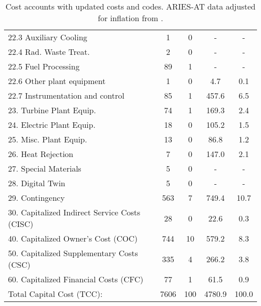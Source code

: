\begin{table}[h!]
{\begin{tabular}{lcccc}
\hspace{10mm}22.3 Auxiliary Cooling & 1 & 0 & - & - \\
\hspace{10mm}22.4 Rad. Waste Treat. & 2 & 0 & - & - \\
\hspace{10mm}22.5 Fuel Processing & 89 & 1 & - & - \\
\hspace{10mm}22.6 Other plant equipment & 1 & 0 & 4.7 & 0.1 \\
\hspace{10mm}22.7 Instrumentation and control & 85 & 1 & 457.6 & 6.5 \\
\hspace{5mm}23. Turbine Plant Equip. & 74 & 1 & 169.3 & 2.4 \\
\hspace{5mm}24. Electric Plant Equip. & 18 & 0 & 105.2 & 1.5 \\
\hspace{5mm}25. Misc. Plant Equip. & 13 & 0 & 86.8 & 1.2 \\
\hspace{5mm}26. Heat Rejection & 7 & 0 & 147.0 & 2.1 \\
\hspace{5mm}27. Special Materials & 5 & 0 & - & - \\
\hspace{5mm}28. Digital Twin & 5 & 0 & - & - \\
\hspace{5mm}29. Contingency & 563 & 7 & 749.4 & 10.7 \\
30. Capitalized Indirect Service Costs (CISC) & 28 & 0 & 22.6 & 0.3 \\
40. Capitalized Owner’s Cost (COC) & 744 & 10 & 579.2 & 8.3 \\
50. Capitalized Supplementary Costs (CSC) & 335 & 4 & 266.2 & 3.8 \\
60. Capitalized Financial Costs (CFC) & 77 & 1 & 61.5 & 0.9 \\
\hline
Total Capital Cost (TCC): & 7606 & 100 & 4780.9 & 100.0 \\
\hline
\end{tabular}
}
\caption{Cost accounts with updated costs and codes. ARIES-AT data adjusted for inflation from \cite{gordon1986mirror}.}
\label{tab:costs_updated_codes}
\end{table}


